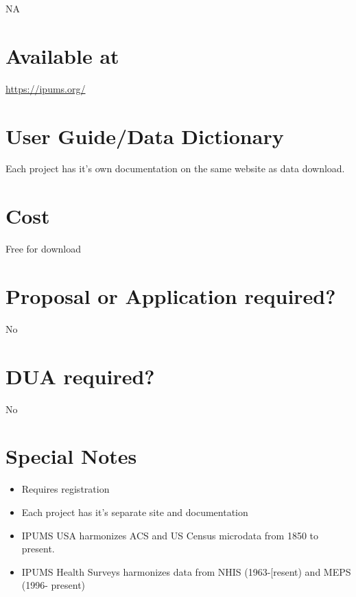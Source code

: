 \documentclass[
]{book}
\providecommand{\tightlist}{%
  \setlength{\itemsep}{0pt}\setlength{\parskip}{0pt}}
\begin{document}
NA

\hypertarget{available-at-35}{%
\section{Available at}\label{available-at-35}}

\url{https://ipums.org/}

\hypertarget{user-guidedata-dictionary-35}{%
\section{User Guide/Data Dictionary}\label{user-guidedata-dictionary-35}}

Each project has it's own documentation on the same website as data download.

\hypertarget{cost-35}{%
\section{Cost}\label{cost-35}}

Free for download

\hypertarget{proposal-or-application-required-35}{%
\section{Proposal or Application required?}\label{proposal-or-application-required-35}}

No

\hypertarget{dua-required-35}{%
\section{DUA required?}\label{dua-required-35}}

No

\hypertarget{special-notes-35}{%
\section{Special Notes}\label{special-notes-35}}

\begin{itemize}
\tightlist
\item
  Requires registration
\item
  Each project has it's separate site and documentation
\item
  IPUMS USA harmonizes ACS and US Census microdata from 1850 to present.
\item
  IPUMS Health Surveys harmonizes data from NHIS (1963-{[}resent) and MEPS (1996- present)
\end{itemize}
\end{document}
